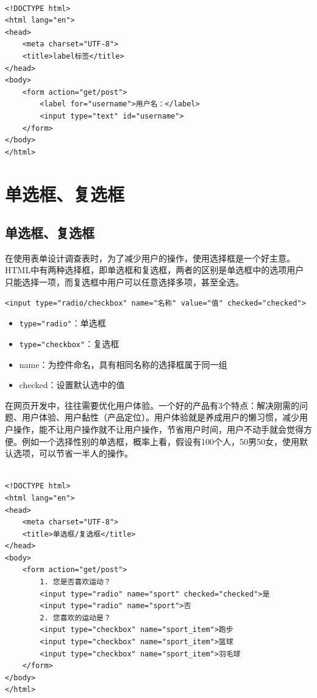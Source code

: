 \\

\begin{lstlisting}[style=htmlcssjs]
<!DOCTYPE html>
<html lang="en">
<head>
    <meta charset="UTF-8">
    <title>label标签</title>
</head>
<body>
    <form action="get/post">
        <label for="username">用户名：</label>
        <input type="text" id="username">
    </form>
</body>
</html>
\end{lstlisting}

\newpage

\section{单选框、复选框}

\subsection{单选框、复选框}

在使用表单设计调查表时，为了减少用户的操作，使用选择框是一个好主意。HTML中有两种选择框，即单选框和复选框，两者的区别是单选框中的选项用户只能选择一项，而复选框中用户可以任意选择多项，甚至全选。\\

\begin{lstlisting}[style=htmlcssjs]
<input type="radio/checkbox" name="名称" value="值" checked="checked">
\end{lstlisting}

\begin{itemize}
	\item \lstinline|type="radio"|：单选框
	\item \lstinline|type="checkbox"|：复选框
	\item name：为控件命名，具有相同名称的选择框属于同一组
	\item checked：设置默认选中的值
\end{itemize}

在网页开发中，往往需要优化用户体验。一个好的产品有3个特点：解决刚需的问题、用户体验、用户黏性（产品定位）。用户体验就是养成用户的懒习惯，减少用户操作，能不让用户操作就不让用户操作，节省用户时间，用户不动手就会觉得方便。例如一个选择性别的单选框，概率上看，假设有100个人，50男50女，使用默认选项，可以节省一半人的操作。\\

\\

\begin{lstlisting}[style=htmlcssjs]
<!DOCTYPE html>
<html lang="en">
<head>
    <meta charset="UTF-8">
    <title>单选框/复选框</title>
</head>
<body>
    <form action="get/post">
        1. 您是否喜欢运动？
        <input type="radio" name="sport" checked="checked">是
        <input type="radio" name="sport">否
        2. 您喜欢的运动是？
        <input type="checkbox" name="sport_item">跑步
        <input type="checkbox" name="sport_item">篮球
        <input type="checkbox" name="sport_item">羽毛球
    </form>
</body>
</html>
\end{lstlisting}

